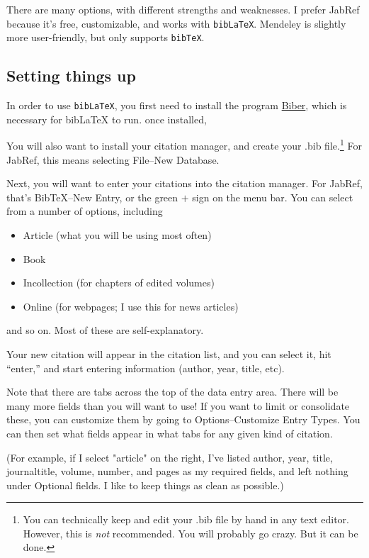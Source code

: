 \documentclass[12pt]{article}
\begin{document}
There are many options, with different strengths and weaknesses. I prefer JabRef because it's free, customizable, and works with \verb+bibLaTeX+. Mendeley is slightly more user-friendly, but only supports \verb+bibTeX+.

\subsection{Setting things up}

In order to use \verb+bibLaTeX+, you first need to install the program \href{http://biblatex-biber.sourceforge.net/}{Biber}, which is necessary for bibLaTeX to run. once installed, 

You will also want to install your citation manager, and create your .bib file.\footnote{You can technically keep and edit your .bib file by hand in any text editor. However, this is {\em not} recommended. You will probably go crazy. But it can be done.} For JabRef, this means selecting File--New Database.

Next, you will want to enter your citations into the citation manager. For JabRef, that's BibTeX--New Entry, or the green $+$ sign on the menu bar. You can select from a number of options, including
\begin{itemize}
	\item Article (what you will be using most often)
	\item Book
	\item Incollection (for chapters of edited volumes)
	\item Online (for webpages; I use this for news articles)
\end{itemize}
and so on. Most of these are self-explanatory.

Your new citation will appear in the citation list, and you can select it, hit ``enter,'' and start entering information (author, year, title, etc). 

Note that there are tabs across the top of the data entry area. There will be many more fields than you will want to use! If you want to limit or consolidate these, you can customize them by going to Options--Customize Entry Types. You can then set what fields appear in what tabs for any given kind of citation. 

(For example, if I select "article" on the right, I've listed author, year, title, journaltitle, volume, number, and pages as my required fields, and left nothing under Optional fields. I like to keep things as clean as possible.)
\end{document}
